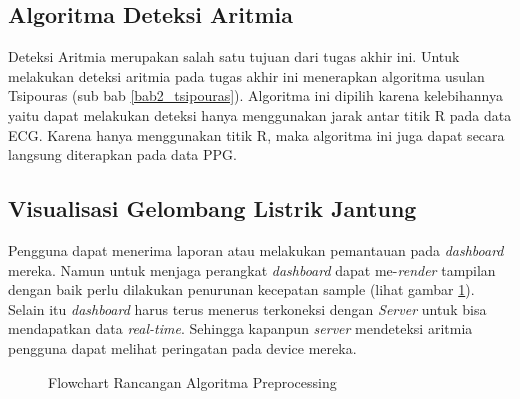 \subsection{Algoritma Deteksi Aritmia}
Deteksi Aritmia merupakan salah satu tujuan dari tugas akhir ini. Untuk melakukan deteksi aritmia pada tugas akhir ini menerapkan algoritma usulan Tsipouras (sub bab \ref{bab2_tsipouras}). Algoritma ini dipilih karena kelebihannya yaitu dapat melakukan deteksi hanya menggunakan jarak antar titik R pada data ECG. Karena hanya menggunakan titik R, maka algoritma ini juga dapat secara langsung diterapkan pada data PPG.

\subsection{Visualisasi Gelombang Listrik Jantung}
Pengguna dapat menerima laporan atau melakukan pemantauan pada \textit{dashboard} mereka. Namun untuk menjaga perangkat \textit{dashboard} dapat me-\textit{render} tampilan dengan baik perlu dilakukan penurunan kecepatan sample (lihat gambar \ref{flow:fig_preproc_algorithm}). Selain itu \textit{dashboard} harus terus menerus terkoneksi dengan \textit{Server} untuk bisa mendapatkan data \textit{real-time}. Sehingga kapanpun \textit{server} mendeteksi aritmia pengguna dapat melihat peringatan pada device mereka. 

\begin{figure}[H]
\centering
    \caption{Flowchart Rancangan Algoritma Preprocessing}
	\label{flow:fig_preproc_algorithm}
\end{figure}

